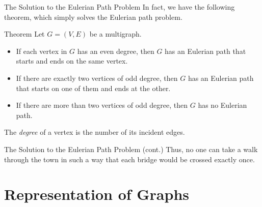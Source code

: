 \documentclass{beamer}
\begin{document}
\begin{frame}{The Solution to the Eulerian Path Problem}
  In fact, we have the following theorem, which simply solves the Eulerian path
  problem. \pause
  \begin{block}{Theorem}
    Let $G = (V, E)$ be a multigraph. \pause
    \begin{itemize}
      \item If each vertex in $G$ has an even degree, then $G$ has an Eulerian
      path that starts and ends on the same vertex. \pause
      \item If there are exactly two vertices of odd degree, then $G$ has an
      Eulerian path that starts on one of them and ends at the other. \pause
      \item If there are more than two vertices of odd degree, then $G$ has
      no Eulerian path. \pause
    \end{itemize}
  \end{block}
  The \emph{degree} of a vertex is the number of its incident edges.
\end{frame}

\begin{frame}{The Solution to the Eulerian Path Problem (cont.)}
  Thus, no one can take a walk through the town in such a way that each bridge
  would be crossed exactly once.
  \begin{figure}
  \end{figure}
\end{frame}

\section{Representation of Graphs}
\end{document}

